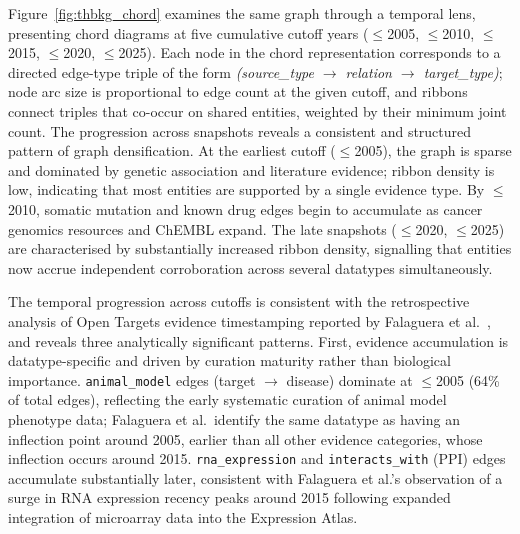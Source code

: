 \documentclass[a4,center]{NAR}
\begin{document}
{Figure~\ref{fig:thbkg_chord} examines the same graph through a temporal
lens, presenting chord diagrams at five cumulative cutoff years ($\leq$2005,
$\leq$2010, $\leq$2015, $\leq$2020, $\leq$2025). Each node in the chord
representation corresponds to a directed edge-type triple of the form
\textit{(source\_type $\rightarrow$ relation $\rightarrow$ target\_type)};
node arc size is proportional to edge count at the given cutoff, and ribbons
connect triples that co-occur on shared entities, weighted by their minimum
joint count. The progression across snapshots reveals a consistent and
structured pattern of graph densification. At the earliest cutoff
($\leq$2005), the graph is sparse and dominated by genetic association and
literature evidence; ribbon density is low, indicating that most entities are
supported by a single evidence type. By $\leq$2010, somatic mutation and known
drug edges begin to accumulate as cancer genomics resources and ChEMBL expand.
The late snapshots ($\leq$2020, $\leq$2025) are characterised by substantially
increased ribbon density, signalling that entities now accrue independent
corroboration across several datatypes simultaneously.

The temporal progression across cutoffs is consistent with the retrospective
analysis of Open Targets evidence timestamping reported by Falaguera et al.\
\citep{Falaguera2025TemporalDiscovery}, and reveals three analytically significant patterns.
First, evidence accumulation is datatype-specific and driven by curation
maturity rather than biological importance.
\texttt{animal\_model} edges (target $\rightarrow$ disease) dominate at
$\leq$2005 (64\% of total edges), reflecting the early systematic curation
of animal model phenotype data; Falaguera et al.\ identify the same
datatype as having an inflection point around 2005, earlier than all
other evidence categories, whose inflection occurs around 2015.
\texttt{rna\_expression} and \texttt{interacts\_with} (PPI) edges
accumulate substantially later, consistent with Falaguera et al.'s
observation of a surge in RNA expression recency peaks around 2015
following expanded integration of microarray data into the Expression Atlas. 

}
\end{document}
